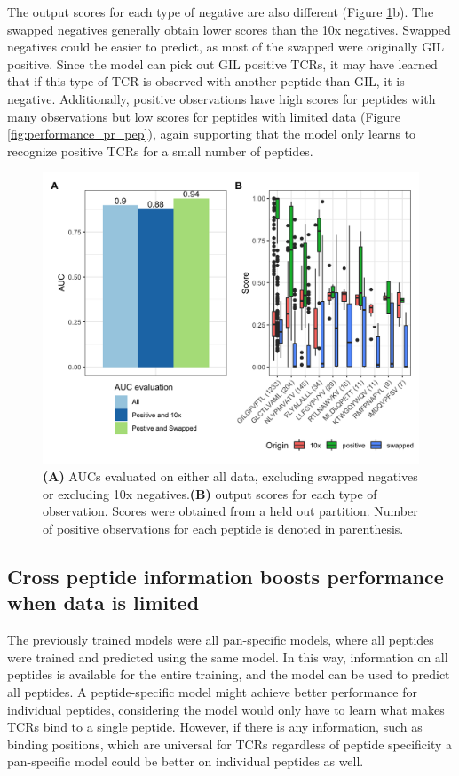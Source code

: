 The output scores for each type of negative are also different (Figure \ref{fig:swap_vs_10x}b). The swapped negatives generally obtain lower scores than the 10x negatives. Swapped negatives could be easier to predict, as most of the swapped were originally GIL positive. Since the model can pick out GIL positive TCRs, it may have learned that if this type of TCR is observed with another peptide than GIL, it is negative. Additionally, positive observations have high scores for peptides with many observations but low scores for peptides with limited data (Figure \ref{fig:performance_pr_pep}), again supporting that the model only learns to recognize positive TCRs for a small number of peptides.

\begin{figure}
    \centering
    \includegraphics[width=\linewidth]{figures/swapped_10x_performances.png}
    \caption{\textbf{(A)} AUCs evaluated on either all data, excluding swapped negatives or excluding 10x negatives.\textbf{(B)} output scores for each type of observation. Scores were obtained from a held out partition. Number of positive observations for each peptide is denoted in parenthesis.}
    \label{fig:swap_vs_10x}
\end{figure}


\subsection{Cross peptide information boosts performance when data is limited}
The previously trained models were all pan-specific models, where all peptides were trained and predicted using the same model. In this way, information on all peptides is available for the entire training, and the model can be used to predict all peptides. A peptide-specific model might achieve better performance for individual peptides, considering the model would only have to learn what makes TCRs bind to a single peptide. However, if there is any information, such as binding positions, which are universal for TCRs regardless of peptide specificity a pan-specific model could be better on individual peptides as well.

